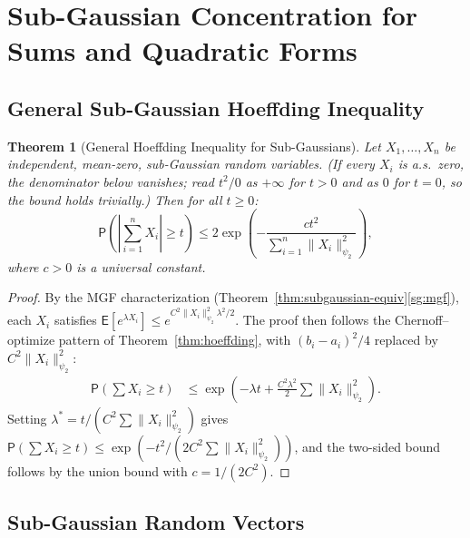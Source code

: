 \documentclass[14pt]{extarticle}
\theoremstyle{plain}
\newtheorem{theorem}{Theorem}[section]
\theoremstyle{definition}
\theoremstyle{remark}
\newcommand\expc{\mathsf{E}}
\newcommand\prb{\mathsf{P}}
\begin{document}
\section{Sub-Gaussian Concentration for Sums and Quadratic Forms}\label{sec:sg-conc}

\subsection{General Sub-Gaussian Hoeffding Inequality}

\begin{theorem}[General Hoeffding Inequality for Sub-Gaussians]\label{thm:hoeffding-sg}
Let $X_1, \ldots, X_n$ be independent, mean-zero, sub-Gaussian random variables. (If every $X_i$ is a.s.\ zero, the denominator below vanishes; read $t^2/0$ as $+\infty$ for $t > 0$ and as $0$ for $t = 0$, so the bound holds trivially.) Then for all $t \geqslant 0$:
\begin{equation}\label{eq:hoeffding-sg}
\prb\!\left(\left|\sum_{i=1}^n X_i\right| \geqslant t\right) \leqslant 2\exp\!\left(-\frac{ct^2}{\sum_{i=1}^n \|X_i\|_{\psi_2}^2}\right),
\end{equation}
where $c > 0$ is a universal constant.
\end{theorem}

\begin{proof}
By the MGF characterization (Theorem~\ref{thm:subgaussian-equiv}\ref{sg:mgf}), each $X_i$ satisfies $\expc[e^{\lambda X_i}] \leqslant e^{C^2\|X_i\|_{\psi_2}^2\lambda^2/2}$. The proof then follows the Chernoff--optimize pattern of Theorem~\ref{thm:hoeffding}, with $(b_i - a_i)^2/4$ replaced by $C^2\|X_i\|_{\psi_2}^2$:
\begin{align*}
\prb\!\left(\sum X_i \geqslant t\right) &\leqslant \exp\!\left(-\lambda t + \frac{C^2\lambda^2}{2}\sum \|X_i\|_{\psi_2}^2\right).
\end{align*}
Setting $\lambda^* = t/(C^2\sum\|X_i\|_{\psi_2}^2)$ gives $\prb(\sum X_i \geqslant t) \leqslant \exp(-t^2/(2C^2\sum\|X_i\|_{\psi_2}^2))$, and the two-sided bound follows by the union bound with $c = 1/(2C^2)$.
\end{proof}

\subsection{Sub-Gaussian Random Vectors}
\end{document}
